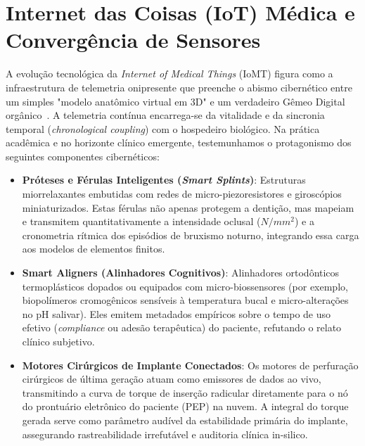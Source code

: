 \section{Internet das Coisas (IoT) Médica e Convergência de Sensores}

A evolução tecnológica da \textit{Internet of Medical Things} (IoMT) figura como a infraestrutura de telemetria onipresente que preenche o abismo cibernético entre um simples "modelo anatômico virtual em 3D" e um verdadeiro Gêmeo Digital orgânico~\cite{mdpi2025digital}. A telemetria contínua encarrega-se da vitalidade e da sincronia temporal (\textit{chronological coupling}) com o hospedeiro biológico. Na prática acadêmica e no horizonte clínico emergente, testemunhamos o protagonismo dos seguintes componentes cibernéticos:

\begin{itemize}
    \item \textbf{Próteses e Férulas Inteligentes (\textit{Smart Splints})}: Estruturas miorrelaxantes embutidas com redes de micro-piezoresistores e giroscópios miniaturizados. Estas férulas não apenas protegem a dentição, mas mapeiam e transmitem quantitativamente a intensidade oclusal ($N/mm^2$) e a cronometria rítmica dos episódios de bruxismo noturno, integrando essa carga aos modelos de elementos finitos.
    \item \textbf{Smart Aligners (Alinhadores Cognitivos)}: Alinhadores ortodônticos termoplásticos dopados ou equipados com micro-biossensores (por exemplo, biopolímeros cromogênicos sensíveis à temperatura bucal e micro-alterações no pH salivar). Eles emitem metadados empíricos sobre o tempo de uso efetivo (\textit{compliance} ou adesão terapêutica) do paciente, refutando o relato clínico subjetivo.
    \item \textbf{Motores Cirúrgicos de Implante Conectados}: Os motores de perfuração cirúrgicos de última geração atuam como emissores de dados ao vivo, transmitindo a curva de torque de inserção radicular diretamente para o nó do prontuário eletrônico do paciente (PEP) na nuvem. A integral do torque gerada serve como parâmetro audível da estabilidade primária do implante, assegurando rastreabilidade irrefutável e auditoria clínica in-silico.
\end{itemize}


